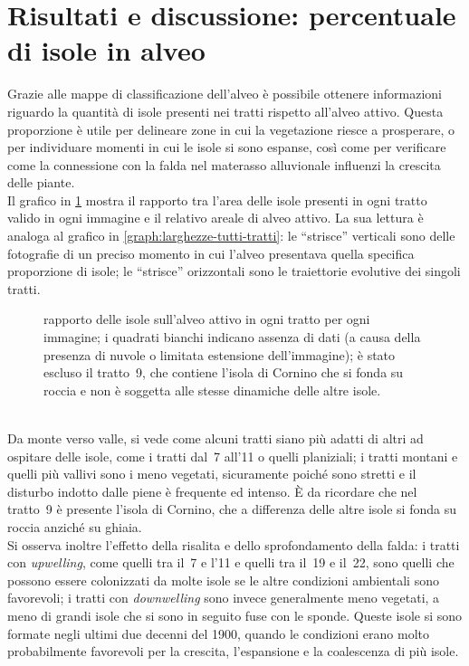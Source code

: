 \section{Risultati e discussione: percentuale di isole in alveo}
Grazie alle mappe di classificazione dell'alveo è possibile ottenere informazioni riguardo la quantità di isole presenti nei tratti rispetto all'alveo attivo.
Questa proporzione è utile per delineare zone in cui la vegetazione riesce a prosperare, o per individuare momenti in cui le isole si sono espanse, così come per verificare come la connessione con la falda nel materasso alluvionale influenzi la crescita delle piante.
\\
Il grafico in \cref{graph:rapp-isl-tutti-tratti} mostra il rapporto tra l'area delle isole presenti in ogni tratto valido in ogni immagine e il relativo areale di alveo attivo.
La sua lettura è analoga al grafico in \cref{graph:larghezze-tutti-tratti}: le “strisce” verticali sono delle fotografie di un preciso momento in cui l'alveo presentava quella specifica proporzione di isole; le “strisce” orizzontali sono le traiettorie evolutive dei singoli tratti.
%
\begin{figure}
	\centering
	
	\caption[rapporto delle isole sull'alveo attivo in ogni tratto per ogni immagine]{rapporto delle isole sull'alveo attivo in ogni tratto per ogni immagine; i quadrati bianchi indicano assenza di dati (a causa della presenza di nuvole o limitata estensione dell'immagine); è stato escluso il tratto~9, che contiene l'isola di Cornino che si fonda su roccia e non è soggetta alle stesse dinamiche delle altre isole.}
	\label{graph:rapp-isl-tutti-tratti}
\end{figure}
%
\\
Da monte verso valle, si vede come alcuni tratti siano più adatti di altri ad ospitare delle isole, come i tratti dal~7 all'11 o quelli planiziali;
i tratti montani e quelli più vallivi sono i meno vegetati, sicuramente poiché sono stretti e il disturbo indotto dalle piene è frequente ed intenso.
È da ricordare che nel tratto~9 è presente l'isola di Cornino, che a differenza delle altre isole si fonda su roccia anziché su ghiaia.
\\
Si osserva inoltre l'effetto della risalita e dello sprofondamento della falda:
i tratti con \emph{upwelling}, come quelli tra il~7 e l'11 e quelli tra il~19 e il~22, sono quelli che possono essere colonizzati da molte isole se le altre condizioni ambientali sono favorevoli; i tratti con \emph{downwelling} sono invece generalmente meno vegetati, a meno di grandi isole che si sono in seguito fuse con le sponde. Queste isole si sono formate negli ultimi due decenni del 1900, quando le condizioni erano molto probabilmente favorevoli per la crescita, l'espansione e la coalescenza di più isole.
